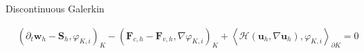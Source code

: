 \documentclass[24pt,t,table, aspectratio=169]{beamer}
\newcommand{\vecu}{\mathbf{u}}
\newcommand{\vecF}{\mathbf{F}}
\newcommand{\vecS}{\mathbf{S}}
\newcommand{\vecw}{\mathbf{w}}
\newcommand{\vecHcal}{\boldsymbol{\mathcal{H}}}
\newcommand{\tesselation}{\mathcal{T}}
\newcommand{\vecn}{\mathbf{n}}
\begin{document}
\begin{frame}{Discontinuous Galerkin}
%
%
%
%
%
%

\begin{equation*}
\begin{aligned}
& \left(\partial_t \vecw_{h} - \vecS_{h}, \varphi_{K,i} \right)_{K} - \left(\vecF_{c, {h}} - \vecF_{v, {h}}, \nabla \varphi_{K,i} \right)_{K} + \left\langle \vecHcal (\vecu_h, \nabla \vecu_h), \varphi_{K,i} \right\rangle_{\partial K} = 0
\end{aligned}
\end{equation*}
\centering
\begin{minipage}{0.69\linewidth}
\end{minipage}
\end{frame}
\end{document}
